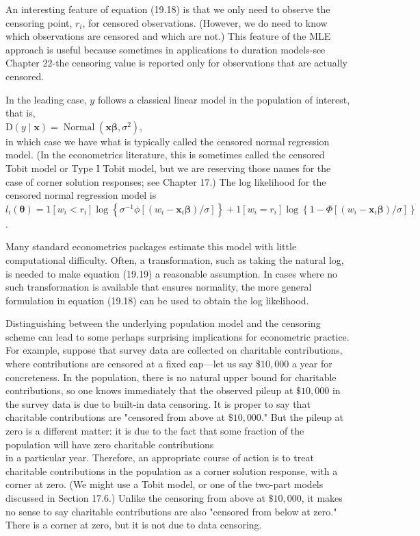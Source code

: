 \documentclass[10pt]{article}
\begin{document}
An interesting feature of equation (19.18) is that we only need to observe the censoring point, $r_{i}$, for censored observations. (However, we do need to know which observations are censored and which are not.) This feature of the MLE approach is useful because sometimes in applications to duration models-see Chapter 22-the censoring value is reported only for observations that are actually censored.

In the leading case, $y$ follows a classical linear model in the population of interest, that is,\\
$\mathrm{D}(y \mid \mathbf{x})=\operatorname{Normal}\left(\mathbf{x} \boldsymbol{\beta}, \sigma^{2}\right)$,\\
in which case we have what is typically called the censored normal regression model. (In the econometrics literature, this is sometimes called the censored Tobit model or Type I Tobit model, but we are reserving those names for the case of corner solution responses; see Chapter 17.) The log likelihood for the censored normal regression model is\\
$l_{i}(\boldsymbol{\theta})=1\left[w_{i}<r_{i}\right] \log \left\{\sigma^{-1} \phi\left[\left(w_{i}-\mathbf{x}_{i} \boldsymbol{\beta}\right) / \sigma\right]\right\}+1\left[w_{i}=r_{i}\right] \log \left\{1-\Phi\left[\left(w_{i}-\mathbf{x}_{i} \boldsymbol{\beta}\right) / \sigma\right]\right\}$.

Many standard econometrics packages estimate this model with little computational difficulty. Often, a transformation, such as taking the natural log, is needed to make equation (19.19) a reasonable assumption. In cases where no such transformation is available that ensures normality, the more general formulation in equation (19.18) can be used to obtain the log likelihood.

Distinguishing between the underlying population model and the censoring scheme can lead to some perhaps surprising implications for econometric practice. For example, suppose that survey data are collected on charitable contributions, where contributions are censored at a fixed cap—let us say $\$ 10,000$ a year for concreteness. In the population, there is no natural upper bound for charitable contributions, so one knows immediately that the observed pileup at $\$ 10,000$ in the survey data is due to built-in data censoring. It is proper to say that charitable contributions are "censored from above at $\$ 10,000$." But the pileup at zero is a different matter: it is due to the fact that some fraction of the population will have zero charitable contributions\\
in a particular year. Therefore, an appropriate course of action is to treat charitable contributions in the population as a corner solution response, with a corner at zero. (We might use a Tobit model, or one of the two-part models discussed in Section 17.6.) Unlike the censoring from above at $\$ 10,000$, it makes no sense to say charitable contributions are also "censored from below at zero." There is a corner at zero, but it is not due to data censoring.
\end{document}
